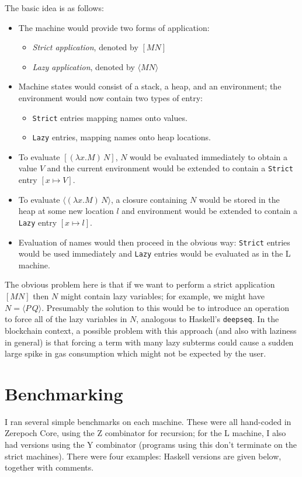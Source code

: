 \documentclass[a4paper]{article}
\begin{document}
\noindent The basic idea is as follows:
\begin{itemize}
\item The machine would provide two forms of application:
  \begin{itemize}
  \item \textit{Strict application}, denoted by $[M N]$
  \item \textit{Lazy application}, denoted by $\langle M N \rangle$
  \end{itemize}
  \item Machine states would consist of a stack, a heap, and an environment;
    the environment would now contain two types of entry:
  \begin{itemize}
  \item \texttt{Strict} entries mapping names onto values.
  \item \texttt{Lazy} entries, mapping names onto heap locations.
  \end{itemize}
  \item To evaluate $[(\lambda x.M)\, N]$, $N$ would be evaluated immediately
    to obtain a value $V$ and the current environment would be extended to
    contain a \texttt{Strict} entry $[x \mapsto V]$.
  \item To evaluate $\langle (\lambda x.M)\, N \rangle$, a closure
    containing $N$ would be stored in the heap at some new location
    $l$ and environment would be extended to contain a \texttt{Lazy}
    entry $[x \mapsto l]$.
  \item Evaluation of names would then proceed in the obvious way:
    \texttt{Strict} entries would be used immediately and \texttt{Lazy}
    entries would be evaluated as in the L machine.
\end{itemize}


\noindent The obvious problem here is that if we want to perform a
strict application $[M N]$ then $N$ might contain lazy variables; for
example, we might have $N = \langle P\, Q \rangle$.  Presumably the
solution to this would be to introduce an operation to force all of
the lazy variables in $N$, analogous to Haskell's \texttt{deepseq}.
In the blockchain context, a possible problem with this approach (and
also with laziness in general) is that forcing a term with many lazy
subterms could cause a sudden large spike in gas consumption which
might not be expected by the user.




\section{Benchmarking}\label{sec:benchmarks}
I ran several simple benchmarks on each machine. These were all hand-coded
in Zerepoch Core, using the Z combinator for recursion; for the L machine, I also
had versions using the Y combinator (programs using this don't terminate on the 
strict machines).  There were four examples: Haskell versions are given below, 
together with comments.
\end{document}
